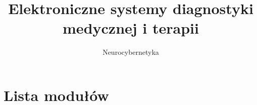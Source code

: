\documentclass[openright]{book}
\begin{document}
\author{Neurocybernetyka}
\title{\Huge{Elektroniczne systemy diagnostyki medycznej i terapii}}

\maketitle
\tableofcontents{}
\newpage{}


\chapter{Lista modułów}
















\newpage{}

\nocite{*}


\end{document}
